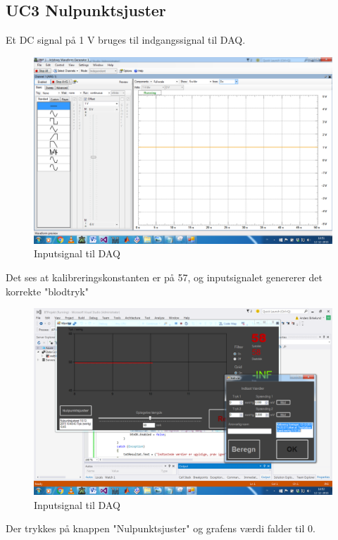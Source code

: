 \subsection{UC3 Nulpunktsjuster}

Et DC signal på 1 V bruges til indgangssignal til DAQ.
\begin{figure}[H]
	\centering
	\includegraphics[width=1\textwidth]{Figurer/Test_Nul_1}
	\caption{Inputsignal til DAQ}
\end{figure}

Det ses at kalibreringskonstanten er på 57, og inputsignalet genererer det korrekte "blodtryk"
\begin{figure}[H]
	\centering
	\includegraphics[width=1\textwidth]{Figurer/Test_Nul_2}
	\caption{Inputsignal til DAQ}
\end{figure}

Der trykkes på knappen "Nulpunktsjuster" og grafens værdi falder til 0. 

